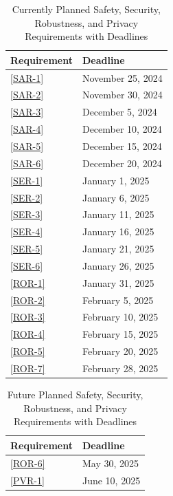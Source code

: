 \documentclass{article}
\begin{document}
\begin{table}[h]
    \centering
    \begin{tabular}{|m{3cm}|m{4cm}|}
        \hline
        \textbf{Requirement} & \textbf{Deadline} \\
        \hline
        \ref{SAR-1} & November 25, 2024 \\
        \hline
        \ref{SAR-2} & November 30, 2024 \\
        \hline
        \ref{SAR-3} & December 5, 2024 \\
        \hline
        \ref{SAR-4} & December 10, 2024 \\
        \hline
        \ref{SAR-5} & December 15, 2024 \\
        \hline
        \ref{SAR-6} & December 20, 2024 \\
        \hline
        \ref{SER-1} & January 1, 2025 \\
        \hline
        \ref{SER-2} & January 6, 2025 \\
        \hline
        \ref{SER-3} & January 11, 2025 \\
        \hline
        \ref{SER-4} & January 16, 2025 \\
        \hline
        \ref{SER-5} & January 21, 2025 \\
        \hline
        \ref{SER-6} & January 26, 2025 \\
        \hline
        \ref{ROR-1} & January 31, 2025 \\
        \hline
        \ref{ROR-2} & February 5, 2025 \\
        \hline
        \ref{ROR-3} & February 10, 2025 \\
        \hline
        \ref{ROR-4} & February 15, 2025 \\
        \hline
        \ref{ROR-5} & February 20, 2025 \\
        \hline
        \ref{ROR-7} & February 28, 2025 \\
        \hline
    \end{tabular}
    \caption{Currently Planned Safety, Security, Robustness, and Privacy Requirements with Deadlines}
    \label{tab:requirements_with_deadlines1}
\end{table}

\begin{table}[h]
    \centering
    \begin{tabular}{|m{3cm}|m{4cm}|}
        \hline
        \textbf{Requirement} & \textbf{Deadline} \\
        \hline
        \ref{ROR-6} & May 30, 2025 \\
        \hline
        \ref{PVR-1} & June 10, 2025 \\
        \hline
    \end{tabular}
    \caption{Future Planned Safety, Security, Robustness, and Privacy Requirements with Deadlines}
    \label{tab:requirements_with_deadlines2}
\end{table}
\newpage{}
\end{document}
